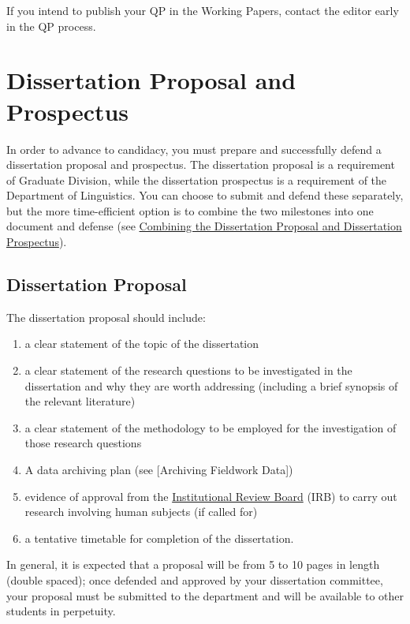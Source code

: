 \documentclass[
]{book}
\providecommand{\tightlist}{%
  \setlength{\itemsep}{0pt}\setlength{\parskip}{0pt}}
\begin{document}
If you intend to publish your QP in the Working Papers, contact the editor early in the QP process.

\chapter{Dissertation Proposal and Prospectus}\label{prospectus}

In order to advance to candidacy, you must prepare and successfully defend a dissertation proposal and prospectus.
The dissertation proposal is a requirement of Graduate Division, while the dissertation prospectus is a requirement of the Department of Linguistics. You can choose to submit and defend these separately, but the more time-efficient option is to combine the two milestones into one document and defense (see \hyperref[combining-the-dissertation-proposal-and-dissertation-prospectus]{Combining the Dissertation Proposal and Dissertation Prospectus}).

\section{Dissertation Proposal}\label{dissertation-proposal}

The dissertation proposal should include:

\begin{enumerate}
\def\labelenumi{\arabic{enumi}.}
\tightlist
\item
  a clear statement of the topic of the dissertation
\item
  a clear statement of the research questions to be investigated in the dissertation and why they are worth addressing (including a brief synopsis of the relevant literature)
\item
  a clear statement of the methodology to be employed for the investigation of those research questions
\item
  A data archiving plan (see {[}Archiving Fieldwork Data{]})
\item
  evidence of approval from the \hyperref[IRB]{Institutional Review Board} (IRB) to carry out research involving human subjects (if called for)
\item
  a tentative timetable for completion of the dissertation.
\end{enumerate}

In general, it is expected that a proposal will be from 5 to 10 pages in length (double spaced); once defended and approved by your dissertation committee, your proposal must be submitted to the department and will be available to other students in perpetuity.
\end{document}
